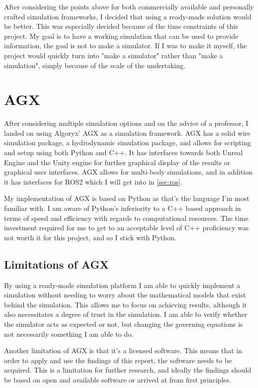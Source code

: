 After considering the points above for both commercially available and personally crafted simulation frameworks, I decided that using a ready-made solution would be better. This was especially decided because of the time constraints of this project. My goal is to have a working simulation that can be used to provide information, the goal is not to make a simulator. If I was to make it myself, the project would quickly turn into "make a simulator" rather than "make a simulation", simply because of the scale of the undertaking. 

\section{AGX}
After considering multiple simulation options and on the advice of a professor, I landed on using Algoryx' AGX as a simulation framework. AGX has a solid wire simulation package, a hydrodynamic simulation package, and allows for scripting and setup using both Python and C++. It has interfaces towards both Unreal Engine and the Unity engine for further graphical display of the results or graphical user interfaces. AGX allows for multi-body simulations, and in addition it has interfaces for ROS2 which I will get into in \cref{sec:ros}. 

My implementation of AGX is based on Python as that's the language I'm most familiar with. I am aware of Python's inferiority to a C++ based approach in terms of speed and efficiency with regards to computational resources. The time investment required for me to get to an acceptable level of C++ proficiency was not worth it for this project, and so I stick with Python.

\subsection{Limitations of AGX}
By using a ready-made simulation platform I am able to quickly implement a simulation without needing to worry about the mathematical models that exist behind the simulation. This allows me to focus on achieving results, although it also necessitates a degree of trust in the simulation. I am able to verify whether the simulator acts as expected or not, but changing the governing equations is not necessarily something I am able to do. 

Another limitation of AGX is that it's a licensed software. This means that in order to apply and use the findings of this report, the software needs to be acquired. This is a limitation for further research, and ideally the findings should be based on open and available software or arrived at from first principles. 

